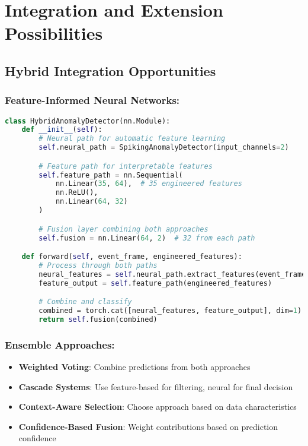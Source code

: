 \documentclass[11pt,a4paper]{article}
\begin{document}
\section{Integration and Extension Possibilities}

\subsection{Hybrid Integration Opportunities}

\subsubsection{Feature-Informed Neural Networks:}
\begin{lstlisting}[language=Python, caption=Hybrid Integration Example]
class HybridAnomalyDetector(nn.Module):
    def __init__(self):
        # Neural path for automatic feature learning
        self.neural_path = SpikingAnomalyDetector(input_channels=2)

        # Feature path for interpretable features
        self.feature_path = nn.Sequential(
            nn.Linear(35, 64),  # 35 engineered features
            nn.ReLU(),
            nn.Linear(64, 32)
        )

        # Fusion layer combining both approaches
        self.fusion = nn.Linear(64, 2)  # 32 from each path

    def forward(self, event_frame, engineered_features):
        # Process through both paths
        neural_features = self.neural_path.extract_features(event_frame)
        feature_output = self.feature_path(engineered_features)

        # Combine and classify
        combined = torch.cat([neural_features, feature_output], dim=1)
        return self.fusion(combined)
\end{lstlisting}

\subsubsection{Ensemble Approaches:}
\begin{itemize}
    \item \textbf{Weighted Voting}: Combine predictions from both approaches
    \item \textbf{Cascade Systems}: Use feature-based for filtering, neural for final decision
    \item \textbf{Context-Aware Selection}: Choose approach based on data characteristics
    \item \textbf{Confidence-Based Fusion}: Weight contributions based on prediction confidence
\end{itemize}
\end{document}
